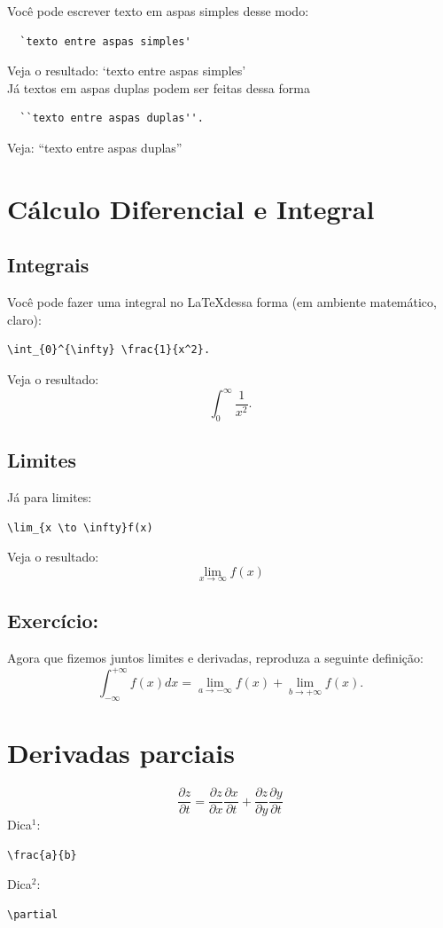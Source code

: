 \documentclass[journal]{IEEEtran}
\begin{document}
Você pode escrever texto em aspas simples desse modo:
\begin{verbatim}
  `texto entre aspas simples'
\end{verbatim}

Veja o resultado:
`texto entre aspas simples'\\

Já textos em aspas duplas podem ser feitas dessa forma
\begin{verbatim}
  ``texto entre aspas duplas''.
\end{verbatim}

Veja: ``texto entre aspas duplas''

\section{Cálculo Diferencial e Integral}

\subsection{Integrais}
Você pode fazer uma integral no \LaTeX dessa forma (em ambiente matemático, claro):
\begin{verbatim}
\int_{0}^{\infty} \frac{1}{x^2}.
\end{verbatim}

Veja o resultado:
\begin{equation}
\int_{0}^{\infty} \frac{1}{x^2}.
\end{equation}


\subsection{Limites}
Já para limites:
\begin{verbatim}
\lim_{x \to \infty}f(x)
\end{verbatim}

Veja o resultado:
\begin{equation}
\lim_{x \to \infty}f(x)
\end{equation}

\subsection{Exercício:}
Agora que fizemos juntos limites e derivadas, reproduza a seguinte definição:
$$
\int_{-\infty}^{+\infty}f(x)dx = \lim_{a \to -\infty}f(x) + \lim_{b \to +\infty}f(x).
$$

\section{Derivadas parciais}
$$
\frac{\partial z}{\partial t} = \frac{\partial z}{\partial x}\frac{\partial x}{\partial t} + \frac{\partial z}{\partial y}\frac{\partial y}{\partial t}
$$
Dica$^1$:
\begin{verbatim}
\frac{a}{b}
\end{verbatim}

Dica$^2$:
\begin{verbatim}
\partial
\end{verbatim}

\IEEEpeerreviewmaketitle


 

\end{document}
